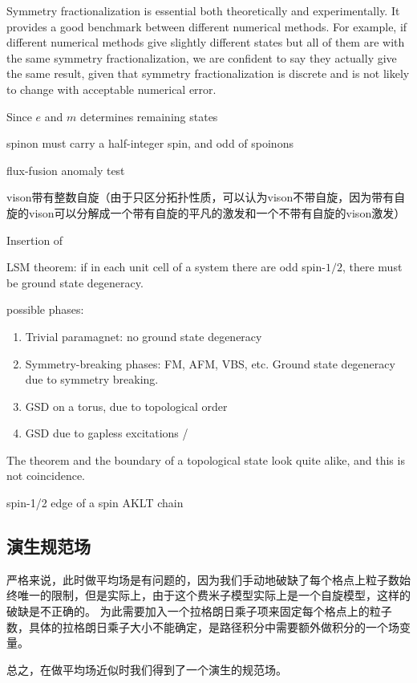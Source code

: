 \documentclass[hyperref, UTF8, a4paper]{ctexart}
\begin{document}
Symmetry fractionalization is essential both theoretically and experimentally. It provides a good benchmark between different numerical methods. For example, if different numerical methods give slightly different states but all of them are with the same symmetry fractionalization, we are confident to say they actually give the same result, given that symmetry fractionalization is discrete and is not likely to change with acceptable numerical error.

Since $e$ and $m$ determines remaining states

spinon must carry a half-integer spin, and odd  of spoinons 

flux-fusion anomaly test

vison带有整数自旋（由于只区分拓扑性质，可以认为vison不带自旋，因为带有自旋的vison可以分解成一个带有自旋的平凡的激发和一个不带有自旋的vison激发）

Insertion of 

LSM theorem: if in each unit cell of a system there are odd spin-$1/2$, there must be ground state degeneracy.

possible phases:

\begin{enumerate}
    \item Trivial paramagnet: no ground state degeneracy
    \item Symmetry-breaking phases: FM, AFM, VBS, etc. Ground state degeneracy due to symmetry breaking.
    \item GSD on a torus, due to topological order
    \item GSD due to gapless excitations / 
\end{enumerate}

The theorem and the boundary of a topological state look quite alike, and this is not coincidence.

spin-1/2 edge of a spin AKLT chain

\subsection{演生规范场}

严格来说，此时做平均场是有问题的，因为我们手动地破缺了每个格点上粒子数始终唯一的限制，但是实际上，由于这个费米子模型实际上是一个自旋模型，这样的破缺是不正确的。
为此需要加入一个拉格朗日乘子项来固定每个格点上的粒子数，具体的拉格朗日乘子大小不能确定，是路径积分中需要额外做积分的一个场变量。

总之，在做平均场近似时我们得到了一个演生的规范场。
\end{document}
